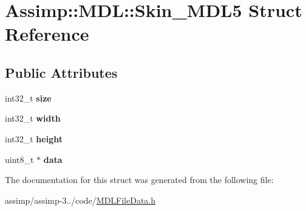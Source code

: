 \hypertarget{struct_assimp_1_1_m_d_l_1_1_skin___m_d_l5}{\section{Assimp\+:\+:M\+D\+L\+:\+:Skin\+\_\+\+M\+D\+L5 Struct Reference}
\label{struct_assimp_1_1_m_d_l_1_1_skin___m_d_l5}
}
\subsection*{Public Attributes}
\begin{DoxyCompactItemize}
\item 
\hypertarget{struct_assimp_1_1_m_d_l_1_1_skin___m_d_l5_a02d33db18e8c0d41bc9f2fea1aae1a30}{int32\+\_\+t {\bfseries size}}\label{struct_assimp_1_1_m_d_l_1_1_skin___m_d_l5_a02d33db18e8c0d41bc9f2fea1aae1a30}

\item 
\hypertarget{struct_assimp_1_1_m_d_l_1_1_skin___m_d_l5_a6087dd498d9e6e1433b822fd9dd2aeb8}{int32\+\_\+t {\bfseries width}}\label{struct_assimp_1_1_m_d_l_1_1_skin___m_d_l5_a6087dd498d9e6e1433b822fd9dd2aeb8}

\item 
\hypertarget{struct_assimp_1_1_m_d_l_1_1_skin___m_d_l5_a55f4032f71454b6df202aaea359e1221}{int32\+\_\+t {\bfseries height}}\label{struct_assimp_1_1_m_d_l_1_1_skin___m_d_l5_a55f4032f71454b6df202aaea359e1221}

\item 
\hypertarget{struct_assimp_1_1_m_d_l_1_1_skin___m_d_l5_ab88acca48d0d5f71240c8df4a0045b34}{uint8\+\_\+t $\ast$ {\bfseries data}}\label{struct_assimp_1_1_m_d_l_1_1_skin___m_d_l5_ab88acca48d0d5f71240c8df4a0045b34}

\end{DoxyCompactItemize}


The documentation for this struct was generated from the following file\+:\begin{DoxyCompactItemize}
\item 
assimp/assimp-\/3../code/\hyperlink{_m_d_l_file_data_8h}{M\+D\+L\+File\+Data.\+h}\end{DoxyCompactItemize}
